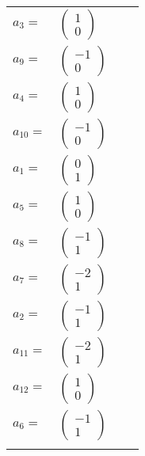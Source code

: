 \documentclass[1p]{elsarticle_modified}
\theoremstyle{definition}
\begin{document}
\begin{tabular}{m{7pt} m{180pt} m{7pt} m{180pt} }
\flushright $a_{3}=$&$\begin{pmatrix}1\\0\end{pmatrix}$ \\
\flushright $a_{9}=$&$\begin{pmatrix}-1\\0\end{pmatrix}$ \\
\flushright $a_{4}=$&$\begin{pmatrix}1\\0\end{pmatrix}$ \\
\flushright $a_{10}=$&$\begin{pmatrix}-1\\0\end{pmatrix}$ \\
\flushright $a_{1}=$&$\begin{pmatrix}0\\1\end{pmatrix}$ \\
\flushright $a_{5}=$&$\begin{pmatrix}1\\0\end{pmatrix}$ \\
\flushright $a_{8}=$&$\begin{pmatrix}-1\\1\end{pmatrix}$ \\
\flushright $a_{7}=$&$\begin{pmatrix}-2\\1\end{pmatrix}$ \\
\flushright $a_{2}=$&$\begin{pmatrix}-1\\1\end{pmatrix}$ \\
\flushright $a_{11}=$&$\begin{pmatrix}-2\\1\end{pmatrix}$ \\
\flushright $a_{12}=$&$\begin{pmatrix}1\\0\end{pmatrix}$ \\
\flushright $a_{6}=$&$\begin{pmatrix}-1\\1\end{pmatrix}$\\&\end{tabular}
\end{document}
